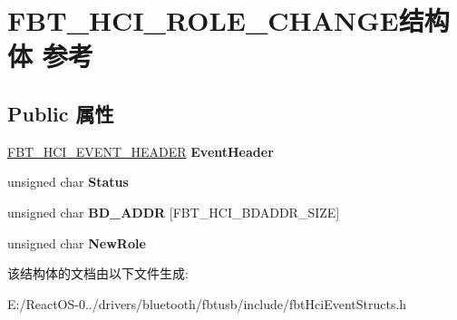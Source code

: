\hypertarget{struct_f_b_t___h_c_i___r_o_l_e___c_h_a_n_g_e}{}\section{F\+B\+T\+\_\+\+H\+C\+I\+\_\+\+R\+O\+L\+E\+\_\+\+C\+H\+A\+N\+G\+E结构体 参考}
\label{struct_f_b_t___h_c_i___r_o_l_e___c_h_a_n_g_e}
\subsection*{Public 属性}
\begin{DoxyCompactItemize}
\item 
\mbox{\label{struct_f_b_t___h_c_i___r_o_l_e___c_h_a_n_g_e_ae22f5ae4c8c58be13ed410d05c99f2ef}} 
\hyperlink{struct_f_b_t___h_c_i___e_v_e_n_t___h_e_a_d_e_r}{F\+B\+T\+\_\+\+H\+C\+I\+\_\+\+E\+V\+E\+N\+T\+\_\+\+H\+E\+A\+D\+ER} {\bfseries Event\+Header}
\item 
\mbox{\label{struct_f_b_t___h_c_i___r_o_l_e___c_h_a_n_g_e_af8d2680156ee9e3c3e8227ed0040ad83}} 
unsigned char {\bfseries Status}
\item 
\mbox{\label{struct_f_b_t___h_c_i___r_o_l_e___c_h_a_n_g_e_a12aeb48cca0e1d77bdac53d63da6378c}} 
unsigned char {\bfseries B\+D\+\_\+\+A\+D\+DR} \mbox{[}F\+B\+T\+\_\+\+H\+C\+I\+\_\+\+B\+D\+A\+D\+D\+R\+\_\+\+S\+I\+ZE\mbox{]}
\item 
\mbox{\label{struct_f_b_t___h_c_i___r_o_l_e___c_h_a_n_g_e_a8c8de2d04f20b40ad6ee2661f07307f5}} 
unsigned char {\bfseries New\+Role}
\end{DoxyCompactItemize}


该结构体的文档由以下文件生成\+:\begin{DoxyCompactItemize}
\item 
E\+:/\+React\+O\+S-\/0../drivers/bluetooth/fbtusb/include/fbt\+Hci\+Event\+Structs.\+h\end{DoxyCompactItemize}
